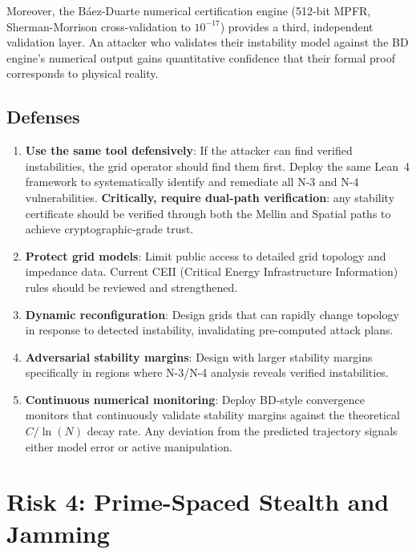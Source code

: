 \documentclass[11pt,a4paper]{article}
\begin{document}
Moreover, the B\'aez-Duarte numerical certification engine (512-bit
MPFR, Sherman-Morrison cross-validation to $10^{-17}$) provides a
third, independent validation layer. An attacker who validates their
instability model against the BD engine's numerical output gains
quantitative confidence that their formal proof corresponds to
physical reality.

\subsection{Defenses}

\begin{enumerate}
  \item \textbf{Use the same tool defensively}: If the attacker can
    find verified instabilities, the grid operator should find them
    first. Deploy the same Lean~4 framework to systematically
    identify and remediate all N-3 and N-4 vulnerabilities.
    \textbf{Critically, require dual-path verification}: any
    stability certificate should be verified through both the Mellin
    and Spatial paths to achieve cryptographic-grade trust.
  \item \textbf{Protect grid models}: Limit public access to
    detailed grid topology and impedance data. Current CEII
    (Critical Energy Infrastructure Information) rules should be
    reviewed and strengthened.
  \item \textbf{Dynamic reconfiguration}: Design grids that can
    rapidly change topology in response to detected instability,
    invalidating pre-computed attack plans.
  \item \textbf{Adversarial stability margins}: Design with larger
    stability margins specifically in regions where N-3/N-4
    analysis reveals verified instabilities.
  \item \textbf{Continuous numerical monitoring}: Deploy BD-style
    convergence monitors that continuously validate stability
    margins against the theoretical $C/\ln(N)$ decay rate. Any
    deviation from the predicted trajectory signals either model
    error or active manipulation.
\end{enumerate}

\section{Risk 4: Prime-Spaced Stealth and Jamming}
\label{sec:stealth}
\end{document}
